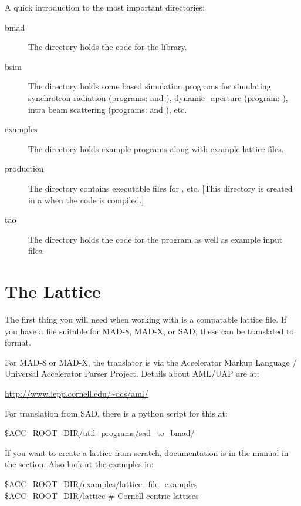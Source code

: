 \documentclass{report}
\begin{document}
A quick introduction to the most important directories:
  \begin{description}
  \item[bmad] \Newline
The  directory holds the code for the \bmad library.
  \item[bsim] \Newline
The  directory holds some \bmad based simulation programs for simulating
synchrotron radiation (programs:  and ), dynamic_aperture
(program: ), intra beam scattering (programs:  and
), etc.
  \item[examples] \Newline
The  directory holds example programs along with example lattice files.
  \item[production] \Newline
The  directory contains executable files for , etc. [This
directory is created in a  when the \bmad code is compiled.]
  \item[tao] \Newline
The  directory holds the code for the  program as well as example input
files.
  \end{description}

\section{The Lattice}

The first thing you will need when working with \bmad is a \bmad compatable lattice file.
If you have a file suitable for MAD-8, MAD-X, or SAD, these can be translated to \bmad
format. 

For MAD-8 or MAD-X, the translator is via the Accelerator Markup Language /
Universal Accelerator Parser Project. Details about AML/UAP are at:
\begin{example}
  \url{http://www.lepp.cornell.edu/~dcs/aml/}
\end{example}

For translation from SAD, there is a python script for this at:
\begin{example}
   \$ACC_ROOT_DIR/util_programs/sad_to_bmad/
\end{example}

If you want to create a \bmad lattice from scratch, documentation is in the \bmad manual
in the  section. Also look at the examples in:
\begin{example}
  \$ACC_ROOT_DIR/examples/lattice_file_examples
  \$ACC_ROOT_DIR/lattice           # Cornell centric lattices
\end{example}
\end{document}
